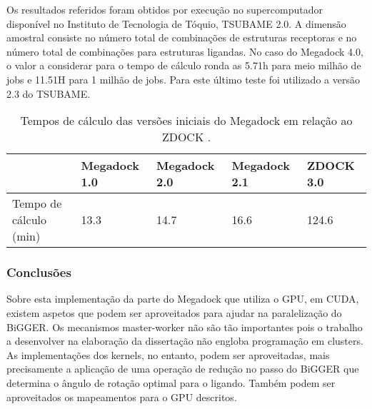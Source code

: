  Os resultados referidos foram obtidos por execução no supercomputador disponível no Instituto de Tecnologia de Tóquio, TSUBAME 2.0. A dimensão amostral consiste no número total de combinações de estruturas receptoras  e no número total de combinações para estruturas ligandas. No caso do Megadock 4.0, o valor a considerar para o tempo de cálculo ronda as 5.71h para meio milhão de jobs e 11.51H para 1 milhão de jobs. Para este último teste foi utilizado a versão 2.3 do TSUBAME\cite{megadock40}. 
\begin{table}[]
\centering
\begin{tabular}{l|l|l|l|l|}
\cline{2-5}
                                             & Megadock 1.0 & Megadock 2.0 & Megadock 2.1 & ZDOCK 3.0 \\ \hline
\multicolumn{1}{|l|}{Tempo de cálculo (min)} & 13.3         & 14.7         & 16.6         & 124.6     \\ \hline
\end{tabular}
\caption{Tempos de cálculo das versões iniciais do Megadock em relação ao ZDOCK \cite{megadock}. }
\label{tab1}
\end{table}
\subsubsection{Conclusões}
Sobre esta implementação da parte do Megadock que utiliza o GPU, em CUDA, existem aspetos que podem ser aproveitados para ajudar na paralelização do BiGGER. Os mecanismos master-worker não são tão importantes pois o trabalho a desenvolver na elaboração da dissertação não engloba programação em clusters. As implementações dos kernels, no entanto, podem ser aproveitadas, mais precisamente a aplicação de uma operação de redução no passo do BiGGER que determina o ângulo de rotação optimal para o ligando. Também podem ser aproveitados os mapeamentos para o GPU descritos.


